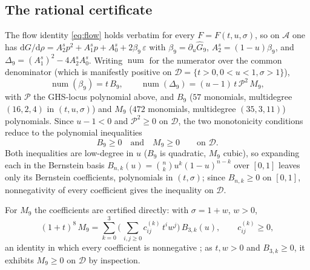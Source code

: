 \documentclass[11pt]{article}
\theoremstyle{plain}
\theoremstyle{definition}
\newcommand{\dd}{\mathrm{d}}
\newcommand{\eps}{\varepsilon}
\begin{document}
\subsection{The rational certificate}\label{sec:ratcert}

The flow identity \eqref{eq:flow} holds verbatim for every $F=F(t,u,\sigma)$, so on $\mathcal A$ one has
$\dd G/\dd\rho=A_2^{s}p^2+A_1^{s}p+A_0^{s}+2\beta_9\,\eps$ with $\beta_9=\partial_u\widehat G_9$,
$A_2^{s}=(1-u)\beta_9$, and $\Delta_9=(A_1^{s})^2-4A_2^{s}A_0^{s}$. Writing $\operatorname{num}$ for the
numerator over the common denominator (which is manifestly positive on $\mathcal D=\{t>0,0<u<1,\sigma>1\}$),
\begin{equation}\label{eq:B9M9}
   \operatorname{num}(\beta_9)=t\,B_9,\qquad \operatorname{num}(\Delta_9)=(u-1)\,t\,\mathcal P^2\,M_9,
\end{equation}
with $\mathcal P$ the GHS-locus polynomial above, and $B_9$ ($57$ monomials, multidegree $(16,2,4)$ in
$(t,u,\sigma)$) and $M_9$ ($472$ monomials, multidegree $(35,3,11)$) polynomials. Since $u-1<0$ and
$\mathcal P^2\ge0$ on $\mathcal D$, the two monotonicity conditions reduce to the polynomial inequalities
\begin{equation*}
   B_9\ge0\quad\text{and}\quad M_9\ge0\qquad\text{on }\mathcal D .
\end{equation*}
Both inequalities are low-degree in $u$ ($B_9$ is quadratic, $M_9$ cubic), so expanding each in the Bernstein
basis $B_{n,k}(u)=\binom nk u^k(1-u)^{n-k}$ over $[0,1]$ leaves only its Bernstein coefficients, polynomials in
$(t,\sigma)$; since $B_{n,k}\ge0$ on $[0,1]$, nonnegativity of every coefficient gives the inequality on
$\mathcal D$.

For $M_9$ the coefficients are certified directly: with $\sigma=1+w$, $w>0$,
\begin{equation}\label{eq:handelman}
   (1+t)^8\,M_9=\sum_{k=0}^{3}\Big(\,\sum_{i,j\ge0}c^{(k)}_{ij}\,t^{i}w^{j}\Big)\,B_{3,k}(u),\qquad c^{(k)}_{ij}\ge0,
\end{equation}
an identity in which every coefficient is nonnegative \cite{Handelman,PowersReznick,Polya}; as $t,w>0$ and $B_{3,k}\ge0$,
it exhibits $M_9\ge0$ on $\mathcal D$ by inspection.
\end{document}
